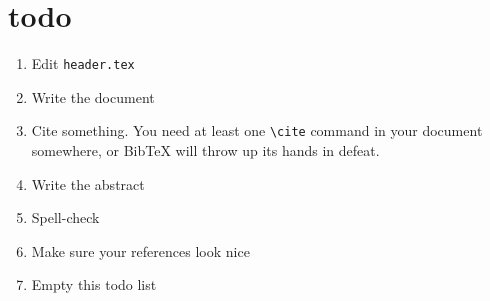 \section*{todo}
\begin{enumerate}
\item Edit \verb+header.tex+
\item Write the document
\item Cite something. \cite[p.~999]{source} You need at least one \verb+\cite+ command in your document somewhere, or BibTeX will throw up its hands in defeat.
\item Write the abstract
\item Spell-check
\item Make sure your references look nice
\item Empty this todo list
\end{enumerate}
